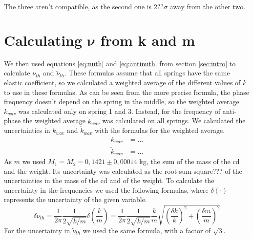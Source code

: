\documentclass{article}
\begin{document}
The three aren't compatible, as the second one is $2?? \sigma$ away from the other two. 


\section{Calculating $\bm \nu$ from k and m} \label{sec:nukm}

We then used equations \ref{eq:nuth} and \ref{eq:antinuth} from section \ref{sec:intro} to calculate $\nu_{th}$
and $\tilde \nu_{th}$. These formulas assume that all springs have
the same elastic coefficient, so we calculated a weighted average of
the different values of $k$ to use in these formulas. As can be seen from the more precise formula, the phase
frequency doesn't depend on the spring in the middle, so the
weighted average $k_{wav}$ was calculated only on spring 1 and 3.
Instead, for the frequency of anti-phase the weighted average 
$\tilde k_{wav}$ was calculated on all springs. We calculated the uncertainties in $k_{wav}$ and $\tilde k_{wav}$ with the formulas for the weighted average. 
\begin{align}
           k_{wav} &= \dots \\
    \tilde k_{wav} &= \dots 
\end{align}
As $m$ we used $M_1=M_2=0,1421 \pm 0,00014$ kg, the sum of the mass of the cd and the weight. Its uncertainty was calculated as the root-sum-square??? of the uncertainties in the mass of the cd and of the weight.
To calculate the uncertainty in the frequencies we used the following formulas, where $\delta(\cdot)$ represents the uncertainty of the given variable.
\begin{equation} \label{eq:inc_nuth}
    \delta \nu_{th}
    = \frac{1}{2\pi} \frac{1}{2\sqrt{k/m}} \delta \left ( \frac{k}{m} \right )
    = \frac{1}{2\pi} \frac{1}{2\sqrt{k/m}}  \frac{k}{m} \sqrt{ \left ( \frac{ \delta k}{k}  \right ) ^2 +
           \left ( \frac{ \delta m}{m}  \right ) ^2}
\end{equation}
For the uncertainty in $\tilde \nu_{th}$ we used the same formula, with a factor of $\sqrt 3$.
\end{document}
